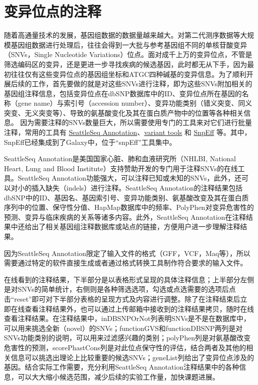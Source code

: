 \section{变异位点的注释}
随着高通量技术的发展，基因组数据的数据量越来越大。对第二代测序数据等大规模基因组数据进行处理后，往往会得到一大批与参考基因组不同的单核苷酸变异（SNVs，Single Nucleotide Variations）位点。面对成千上万的变异位点，不管是筛选编码区的变异，还是更进一步寻找疾病的候选基因，此时都无从下手，因为最初往往仅有这些变异位点的基因组坐标和ATGC四种碱基的变异信息。为了顺利开展后续的工作，首先要做的就是对这些SNVs进行注释，即为这些SNVs附加相关的基因组注释信息，包括变异位点在dbSNP数据库中的ID、变异位点所在基因的名称（gene name）与索引号（accession number）、变异功能类别（错义突变、同义突变、无义突变等）、导致的氨基酸变化及其在蛋白质产物中的位置等各种相关信息。 因为需要注释的SNVs数量巨大，所以需要使用专门的工具来对它们进行批量注释，常用的工具有 \href{http://snp.gs.washington.edu/SeattleSeqAnnotation137/index.jsp}{SeattleSeq Annotation}、\href{http://varianttools.sourceforge.net}{variant tools} 和 \href{http://snpeff.sourceforge.net}{SnpEff} 等。其中，SnpEff已经集成到了Galaxy中，位于“snpEff”工具集中。

SeattleSeq Annotation是美国国家心脏、肺和血液研究所（NHLBI, National Heart, Lung and Blood Institute）支持赞助开发的专门用于注释SNVs的在线工具。SeattleSeq Annotation功能强大，可以注释已知或未知的SNVs，此外，还可以对小的插入缺失（indels）进行注释。SeattleSeq Annotation的注释结果包括dbSNP中的ID、基因名、基因索引号、变异功能类别、氨基酸改变及其在蛋白质序列中的位置、保守性分值、HapMap数据库中的频率、PolyPhen对变异危害性的预测、变异与临床疾病的关系等诸多内容。此外，SeattleSeq Annotation在注释结果中还给出了相关基因组注释数据库或站点的链接，方便用户进一步理解注释结果。

因为SeattleSeq Annotation限定了输入文件的格式（GFF，VCF，Maq等），所以需要通过特定的软件直接生成或者通过格式转换工具制作符合要求的输入文件。

在线看到的注释结果，下半部分是以表格形式呈现的具体注释信息；上半部分左侧是对SNVs的简单统计，右侧则是各种筛选选项，勾选或点选需要的选项后点击“reset”即可对下半部分表格的呈现方式及内容进行调整。除了在注释结束后立即在线查看注释结果外，也可以通过上传邮箱中接收到的注释结果拷贝，随时在线查看注释结果。在注释结果中，inDBSNPOrNot列表明SNVs是不是在数据库中，可以用来挑选全新（novel）的SNVs；functionGVS和functionDBSNP两列是对SNVs功能类别的说明，可以用来过滤感兴趣的类别；polyPhen列是对氨基酸改变危害性的预测，scorePhastCons列是对此位点保守性的评估，结合两者及其他的相关信息可以挑选出理论上比较重要的候选SNVs；geneList列给出了变异位点涉及的基因。结合实际工作需要，充分利用SeattleSeq Annotation注释结果中的各种信息，可以大大缩小候选范围，减少后续的实验工作量，加快课题进展。

